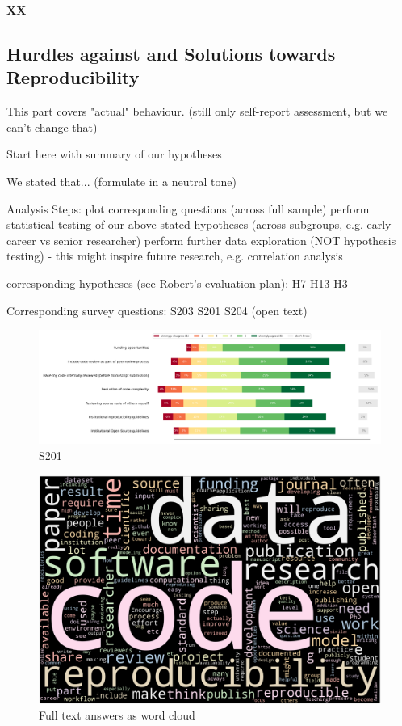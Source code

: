 \documentclass{article}
\begin{document}
\textbf{XX}

\subsection{Hurdles against and Solutions towards Reproducibility}

This part covers "actual" behaviour. (still only self-report assessment, but we can't change that)

    Start here with summary of our hypotheses

We stated that... (formulate in a neutral tone)

    Analysis Steps:
        plot corresponding questions (across full sample)
        perform statistical testing of our above stated hypotheses (across subgroups, e.g. early career vs senior researcher)
        perform further data exploration (NOT hypothesis testing) - this might inspire future research, e.g. correlation analysis

    corresponding hypotheses (see Robert's evaluation plan):
        H7
        H13
        H3

    Corresponding survey questions:
        S203
        S201
        S204 (open text)

\begin{figure}[!p]
    \centering
    \includegraphics[width=\textwidth]{../figs/S201.png}
	\caption{S201 }
    \label{fig:S201}
\end{figure}

\begin{figure}[!p]
    \centering
    \includegraphics[width=\textwidth]{../word_cloud.png}
	\caption{Full text answers as word cloud }
    \label{fig:wc}
\end{figure}
\end{document}
